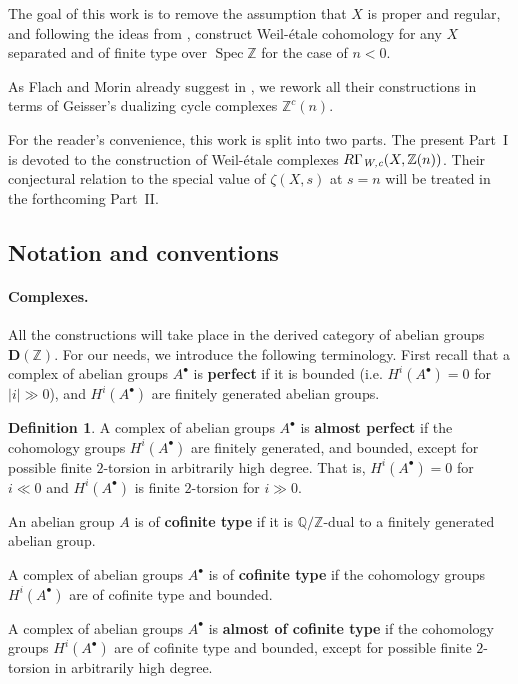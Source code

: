 \documentclass[leqno,12pt]{article}
\theoremstyle{plain}
\theoremstyle{definition}
\newtheorem{definition}[theorem]{\indent\sc Definition}
\DeclareMathOperator{\Spec}{Spec}
\newcommand{\ZZ}{\mathbb{Z}}
\newcommand{\QQ}{\mathbb{Q}}
\newcommand{\Wc}{\text{\it W,c}}
\begin{document}
The goal of this work is to remove the assumption that $X$ is proper and
regular, and following the ideas from \cite{Flach-Morin-2018}, construct
Weil-\'{e}tale cohomology for any $X$ separated and of finite type over $\Spec\ZZ$
for the case of $n < 0$.

As Flach and Morin already suggest in \cite[Remark 3.11]{Flach-Morin-2018},
we rework all their constructions in terms of Geisser's dualizing cycle
complexes $\ZZ^c (n)$.

For the reader's convenience, this work is split into two parts. The present
Part~I is devoted to the construction of Weil-\'{e}tale complexes
$R\Gamma_\Wc (X, \ZZ (n))$. Their conjectural relation to the special value
of $\zeta (X,s)$ at $s = n$ will be treated in the forthcoming Part~II.

\subsection*{Notation and conventions}

\paragraph{Complexes.}
All the constructions will take place in the derived category of abelian groups
$\mathbf{D} (\ZZ)$. For our needs, we introduce the following terminology.
First recall that a complex of abelian groups $A^\bullet$ is \textbf{perfect} if
it is bounded (i.e. $H^i (A^\bullet) = 0$ for $|i| \gg 0$), and $H^i (A^\bullet)$
are finitely generated abelian groups.

\begin{definition}
  \label{dfn:almost-of-(co)finite-type}
  A complex of abelian groups $A^\bullet$ is \textbf{almost perfect}
  if the cohomology groups $H^i (A^\bullet)$ are finitely generated, and
  bounded, except for possible finite $2$-torsion in arbitrarily high degree.
  That is, $H^i (A^\bullet) = 0$ for $i \ll 0$ and $H^i (A^\bullet)$ is finite
  $2$-torsion for $i \gg 0$.

  An abelian group $A$ is of \textbf{cofinite type} if it is $\QQ/\ZZ$-dual to
  a finitely generated abelian group.

  A complex of abelian groups $A^\bullet$ is of \textbf{cofinite type} if the
  cohomology groups $H^i (A^\bullet)$ are of cofinite type and bounded.

  A complex of abelian groups $A^\bullet$ is \textbf{almost of cofinite type}
  if the cohomology groups $H^i (A^\bullet)$ are of cofinite type and
  bounded, except for possible finite $2$-torsion in arbitrarily high
  degree.
\end{definition}
\end{document}
